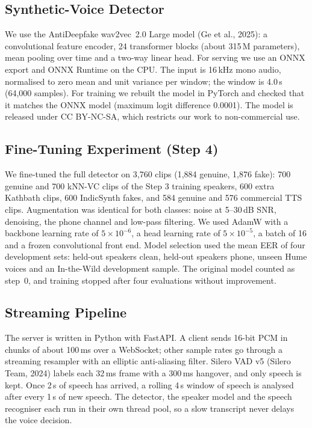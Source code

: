 \documentclass[10pt,a4paper,twocolumn]{article}
\begin{document}
\subsection{Synthetic-Voice Detector}
We use the AntiDeepfake wav2vec~2.0 Large model (Ge et al., 2025): a convolutional feature encoder, 24 transformer blocks (about 315\,M parameters), mean pooling over time and a two-way linear head. For serving we use an ONNX export and ONNX Runtime on the CPU. The input is 16\,kHz mono audio, normalised to zero mean and unit variance per window; the window is 4.0\,s (64,000 samples). For training we rebuilt the model in PyTorch and checked that it matches the ONNX model (maximum logit difference 0.0001). The model is released under CC BY-NC-SA, which restricts our work to non-commercial use.

\subsection{Fine-Tuning Experiment (Step 4)}
We fine-tuned the full detector on 3,760 clips (1,884 genuine, 1,876 fake): 700 genuine and 700 kNN-VC clips of the Step 3 training speakers, 600 extra Kathbath clips, 600 IndicSynth fakes, and 584 genuine and 576 commercial TTS clips. Augmentation was identical for both classes: noise at 5--30\,dB SNR, denoising, the phone channel and low-pass filtering. We used AdamW with a backbone learning rate of $5\times10^{-6}$, a head learning rate of $5\times10^{-5}$, a batch of 16 and a frozen convolutional front end. Model selection used the mean EER of four development sets: held-out speakers clean, held-out speakers phone, unseen Hume voices and an In-the-Wild development sample. The original model counted as step~0, and training stopped after four evaluations without improvement.

\subsection{Streaming Pipeline}
The server is written in Python with FastAPI. A client sends 16-bit PCM in chunks of about 100\,ms over a WebSocket; other sample rates go through a streaming resampler with an elliptic anti-aliasing filter. Silero VAD v5 (Silero Team, 2024) labels each 32\,ms frame with a 300\,ms hangover, and only speech is kept. Once 2\,s of speech has arrived, a rolling 4\,s window of speech is analysed after every 1\,s of new speech. The detector, the speaker model and the speech recogniser each run in their own thread pool, so a slow transcript never delays the voice decision.
\end{document}
